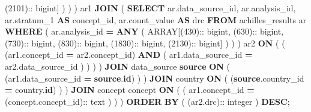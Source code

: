 \documentclass[
]{book}
\newenvironment{Shaded}{\begin{snugshade}}{\end{snugshade}}
\newcommand{\DataTypeTok}[1]{\textcolor[rgb]{0.13,0.29,0.53}{#1}}
\newcommand{\DecValTok}[1]{\textcolor[rgb]{0.00,0.00,0.81}{#1}}
\newcommand{\KeywordTok}[1]{\textcolor[rgb]{0.13,0.29,0.53}{\textbf{#1}}}
\newcommand{\NormalTok}[1]{#1}
\newcommand{\OperatorTok}[1]{\textcolor[rgb]{0.81,0.36,0.00}{\textbf{#1}}}
\begin{document}
\begin{Shaded}
\begin{Highlighting}[]
\NormalTok{                  (}\DecValTok{2101}\NormalTok{):: bigint]}
\NormalTok{                )}
\NormalTok{              )}
\NormalTok{          ) ar1}
          \KeywordTok{JOIN}\NormalTok{ (}
            \KeywordTok{SELECT}
\NormalTok{              ar.data\_source\_id,}
\NormalTok{              ar.analysis\_id,}
\NormalTok{              ar.stratum\_1 }\KeywordTok{AS}\NormalTok{ concept\_id,}
\NormalTok{              ar.count\_value }\KeywordTok{AS}\NormalTok{ drc}
            \KeywordTok{FROM}
\NormalTok{              achilles\_results ar}
            \KeywordTok{WHERE}
\NormalTok{              (}
\NormalTok{                ar.analysis\_id }\OperatorTok{=} \KeywordTok{ANY}\NormalTok{ (}
                  \DataTypeTok{ARRAY}\NormalTok{[(}\DecValTok{430}\NormalTok{):: bigint,}
\NormalTok{                  (}\DecValTok{630}\NormalTok{):: bigint,}
\NormalTok{                  (}\DecValTok{730}\NormalTok{):: bigint,}
\NormalTok{                  (}\DecValTok{830}\NormalTok{):: bigint,}
\NormalTok{                  (}\DecValTok{1830}\NormalTok{):: bigint,}
\NormalTok{                  (}\DecValTok{2130}\NormalTok{):: bigint]}
\NormalTok{                )}
\NormalTok{              )}
\NormalTok{          ) ar2 }\KeywordTok{ON}\NormalTok{ (}
\NormalTok{            (}
\NormalTok{              (ar1.concept\_id }\OperatorTok{=}\NormalTok{ ar2.concept\_id)}
              \KeywordTok{AND}\NormalTok{ (}
\NormalTok{                ar1.data\_source\_id }\OperatorTok{=}\NormalTok{ ar2.data\_source\_id}
\NormalTok{              )}
\NormalTok{            )}
\NormalTok{          )}
\NormalTok{        )}
        \KeywordTok{JOIN}\NormalTok{ data\_source }\KeywordTok{source} \KeywordTok{ON}\NormalTok{ (}
\NormalTok{          (ar1.data\_source\_id }\OperatorTok{=} \KeywordTok{source}\NormalTok{.}\KeywordTok{id}\NormalTok{)}
\NormalTok{        )}
\NormalTok{      )}
      \KeywordTok{JOIN}\NormalTok{ country }\KeywordTok{ON}\NormalTok{ (}
\NormalTok{        (}\KeywordTok{source}\NormalTok{.country\_id }\OperatorTok{=}\NormalTok{ country.}\KeywordTok{id}\NormalTok{)}
\NormalTok{      )}
\NormalTok{    )}
    \KeywordTok{JOIN}\NormalTok{ concept concept }\KeywordTok{ON}\NormalTok{ (}
\NormalTok{      (}
\NormalTok{        ar1.concept\_id }\OperatorTok{=}\NormalTok{ (concept.concept\_id):: text}
\NormalTok{      )}
\NormalTok{    )}
\NormalTok{  )}
\KeywordTok{ORDER} \KeywordTok{BY}
\NormalTok{  (}
\NormalTok{    (ar2.drc):: }\DataTypeTok{integer}
\NormalTok{  ) }\KeywordTok{DESC}\NormalTok{;}
\end{Highlighting}
\end{Shaded}
\end{document}
